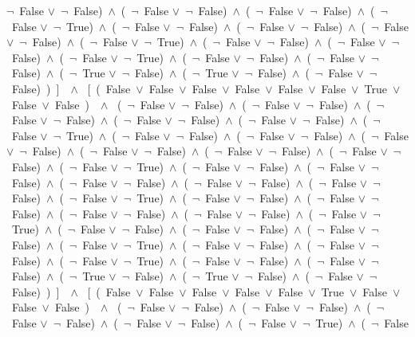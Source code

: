 ﻿\documentclass[a4paper,10pt]{article}
\begin{document}
 $\neg$\ False $\vee$\  $\neg$\ False)\ $\wedge$\ (\  $\neg$\ False $\vee$\  $\neg$\ False)\ $\wedge$\ (\  $\neg$\ False $\vee$\  $\neg$\ False)\ $\wedge$\ (\  $\neg$\ False $\vee$\  $\neg$\ True)\ $\wedge$\ (\  $\neg$\ False $\vee$\  $\neg$\ False)\ $\wedge$\ (\  $\neg$\ False $\vee$\  $\neg$\ False)\ $\wedge$\ (\  $\neg$\ False $\vee$\  $\neg$\ False)\ $\wedge$\ (\  $\neg$\ False $\vee$\  $\neg$\ True)\ $\wedge$\ (\  $\neg$\ False $\vee$\  $\neg$\ False)\ $\wedge$\ (\  $\neg$\ False $\vee$\  $\neg$\ False)\ $\wedge$\ (\  $\neg$\ False $\vee$\  $\neg$\ True)\ $\wedge$\ (\  $\neg$\ False $\vee$\  $\neg$\ False)\ $\wedge$\ (\  $\neg$\ False $\vee$\  $\neg$\ False)\ $\wedge$\ (\  $\neg$\ True $\vee$\  $\neg$\ False)\ $\wedge$\ (\  $\neg$\ True $\vee$\  $\neg$\ False)\ $\wedge$\ (\  $\neg$\ False $\vee$\  $\neg$\ False)\ )\ ]\ \ $\wedge$ \ [\ (\ False\ $\vee$\ False\ $\vee$\ False\ $\vee$\ False\ $\vee$\ False\ $\vee$\ False\ $\vee$\ True\ $\vee$\ False\ $\vee$\ False\ )\ \ $\wedge$ \ (\  $\neg$\ False $\vee$\  $\neg$\ False)\ $\wedge$\ (\  $\neg$\ False $\vee$\  $\neg$\ False)\ $\wedge$\ (\  $\neg$\ False $\vee$\  $\neg$\ False)\ $\wedge$\ (\  $\neg$\ False $\vee$\  $\neg$\ False)\ $\wedge$\ (\  $\neg$\ False $\vee$\  $\neg$\ False)\ $\wedge$\ (\  $\neg$\ False $\vee$\  $\neg$\ True)\ $\wedge$\ (\  $\neg$\ False $\vee$\  $\neg$\ False)\ $\wedge$\ (\  $\neg$\ False $\vee$\  $\neg$\ False)\ $\wedge$\ (\  $\neg$\ False $\vee$\  $\neg$\ False)\ $\wedge$\ (\  $\neg$\ False $\vee$\  $\neg$\ False)\ $\wedge$\ (\  $\neg$\ False $\vee$\  $\neg$\ False)\ $\wedge$\ (\  $\neg$\ False $\vee$\  $\neg$\ False)\ $\wedge$\ (\  $\neg$\ False $\vee$\  $\neg$\ True)\ $\wedge$\ (\  $\neg$\ False $\vee$\  $\neg$\ False)\ $\wedge$\ (\  $\neg$\ False $\vee$\  $\neg$\ False)\ $\wedge$\ (\  $\neg$\ False $\vee$\  $\neg$\ False)\ $\wedge$\ (\  $\neg$\ False $\vee$\  $\neg$\ False)\ $\wedge$\ (\  $\neg$\ False $\vee$\  $\neg$\ False)\ $\wedge$\ (\  $\neg$\ False $\vee$\  $\neg$\ True)\ $\wedge$\ (\  $\neg$\ False $\vee$\  $\neg$\ False)\ $\wedge$\ (\  $\neg$\ False $\vee$\  $\neg$\ False)\ $\wedge$\ (\  $\neg$\ False $\vee$\  $\neg$\ False)\ $\wedge$\ (\  $\neg$\ False $\vee$\  $\neg$\ False)\ $\wedge$\ (\  $\neg$\ False $\vee$\  $\neg$\ True)\ $\wedge$\ (\  $\neg$\ False $\vee$\  $\neg$\ False)\ $\wedge$\ (\  $\neg$\ False $\vee$\  $\neg$\ False)\ $\wedge$\ (\  $\neg$\ False $\vee$\  $\neg$\ False)\ $\wedge$\ (\  $\neg$\ False $\vee$\  $\neg$\ True)\ $\wedge$\ (\  $\neg$\ False $\vee$\  $\neg$\ False)\ $\wedge$\ (\  $\neg$\ False $\vee$\  $\neg$\ False)\ $\wedge$\ (\  $\neg$\ False $\vee$\  $\neg$\ True)\ $\wedge$\ (\  $\neg$\ False $\vee$\  $\neg$\ False)\ $\wedge$\ (\  $\neg$\ False $\vee$\  $\neg$\ False)\ $\wedge$\ (\  $\neg$\ True $\vee$\  $\neg$\ False)\ $\wedge$\ (\  $\neg$\ True $\vee$\  $\neg$\ False)\ $\wedge$\ (\  $\neg$\ False $\vee$\  $\neg$\ False)\ )\ ]\ \ $\wedge$ \ [\ (\ False\ $\vee$\ False\ $\vee$\ False\ $\vee$\ False\ $\vee$\ False\ $\vee$\ True\ $\vee$\ False\ $\vee$\ False\ $\vee$\ False\ )\ \ $\wedge$ \ (\  $\neg$\ False $\vee$\  $\neg$\ False)\ $\wedge$\ (\  $\neg$\ False $\vee$\  $\neg$\ False)\ $\wedge$\ (\  $\neg$\ False $\vee$\  $\neg$\ False)\ $\wedge$\ (\  $\neg$\ False $\vee$\  $\neg$\ False)\ $\wedge$\ (\  $\neg$\ False $\vee$\  $\neg$\ True)\ $\wedge$\ (\  $\neg$\ False 
\end{document}
